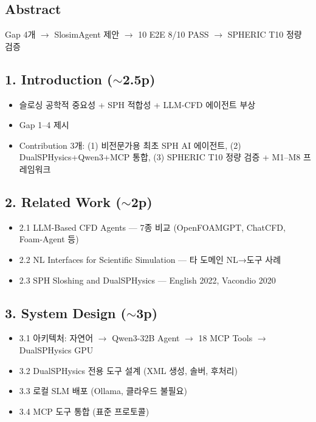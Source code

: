 \documentclass[11pt,a4paper]{article}
\begin{document}
\subsection{Abstract}
Gap 4개 $\rightarrow$ SlosimAgent 제안 $\rightarrow$ 10 E2E 8/10 PASS $\rightarrow$ SPHERIC T10 정량 검증

\subsection{1. Introduction ({\small\color{gray}$\sim$2.5p})}
\begin{itemize}[nosep,leftmargin=1.5em]
\item 슬로싱 공학적 중요성 + SPH 적합성 + LLM-CFD 에이전트 부상
\item Gap 1--4 제시
\item Contribution 3개: (1) 비전문가용 최초 SPH AI 에이전트, (2) DualSPHysics+Qwen3+MCP 통합, (3) SPHERIC T10 정량 검증 + M1--M8 프레임워크
\end{itemize}

\subsection{2. Related Work ({\small\color{gray}$\sim$2p})}
\begin{itemize}[nosep,leftmargin=1.5em]
\item 2.1 LLM-Based CFD Agents --- 7종 비교 (OpenFOAMGPT, ChatCFD, Foam-Agent 등)
\item 2.2 NL Interfaces for Scientific Simulation --- 타 도메인 NL→도구 사례
\item 2.3 SPH Sloshing and DualSPHysics --- English 2022, Vacondio 2020
\end{itemize}

\subsection{3. System Design ({\small\color{gray}$\sim$3p})}
\begin{itemize}[nosep,leftmargin=1.5em]
\item 3.1 아키텍처: 자연어 $\rightarrow$ Qwen3-32B Agent $\rightarrow$ 18 MCP Tools $\rightarrow$ DualSPHysics GPU
\item 3.2 DualSPHysics 전용 도구 설계 (XML 생성, 솔버, 후처리)
\item 3.3 로컬 SLM 배포 (Ollama, 클라우드 불필요)
\item 3.4 MCP 도구 통합 (표준 프로토콜)
\end{itemize}
\end{document}
